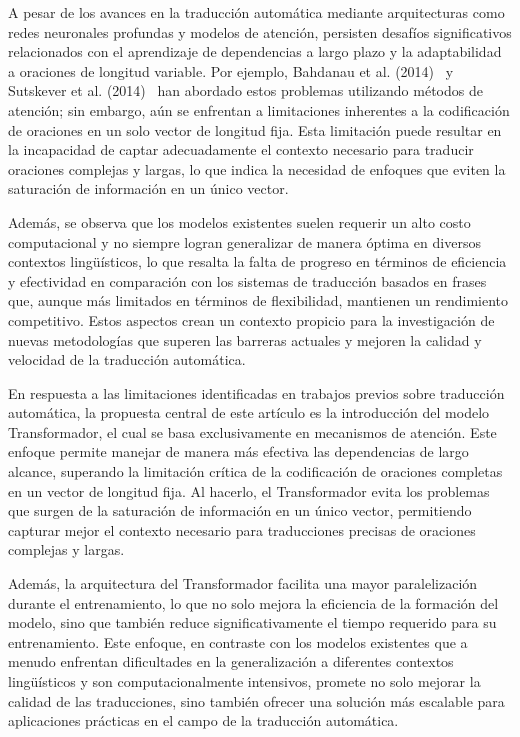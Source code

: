 \documentclass[journal]{IEEEtran}
\begin{document}
A pesar de los avances en la traducción automática mediante arquitecturas como redes neuronales profundas y modelos de atención, persisten desafíos significativos relacionados con el aprendizaje de dependencias a largo plazo y la adaptabilidad a oraciones de longitud variable. Por ejemplo, Bahdanau et al. (2014)~\cite{bahdanau2014neuralmt} y Sutskever et al. (2014)~\cite{sutskever2014seq2seq} han abordado estos problemas utilizando métodos de atención; sin embargo, aún se enfrentan a limitaciones inherentes a la codificación de oraciones en un solo vector de longitud fija. Esta limitación puede resultar en la incapacidad de captar adecuadamente el contexto necesario para traducir oraciones complejas y largas, lo que indica la necesidad de enfoques que eviten la saturación de información en un único vector.

Además, se observa que los modelos existentes suelen requerir un alto costo computacional y no siempre logran generalizar de manera óptima en diversos contextos lingüísticos, lo que resalta la falta de progreso en términos de eficiencia y efectividad en comparación con los sistemas de traducción basados en frases que, aunque más limitados en términos de flexibilidad, mantienen un rendimiento competitivo. Estos aspectos crean un contexto propicio para la investigación de nuevas metodologías que superen las barreras actuales y mejoren la calidad y velocidad de la traducción automática.

En respuesta a las limitaciones identificadas en trabajos previos sobre traducción automática, la propuesta central de este artículo es la introducción del modelo Transformador, el cual se basa exclusivamente en mecanismos de atención. Este enfoque permite manejar de manera más efectiva las dependencias de largo alcance, superando la limitación crítica de la codificación de oraciones completas en un vector de longitud fija. Al hacerlo, el Transformador evita los problemas que surgen de la saturación de información en un único vector, permitiendo capturar mejor el contexto necesario para traducciones precisas de oraciones complejas y largas.

Además, la arquitectura del Transformador facilita una mayor paralelización durante el entrenamiento, lo que no solo mejora la eficiencia de la formación del modelo, sino que también reduce significativamente el tiempo requerido para su entrenamiento. Este enfoque, en contraste con los modelos existentes que a menudo enfrentan dificultades en la generalización a diferentes contextos lingüísticos y son computacionalmente intensivos, promete no solo mejorar la calidad de las traducciones, sino también ofrecer una solución más escalable para aplicaciones prácticas en el campo de la traducción automática.
\end{document}
